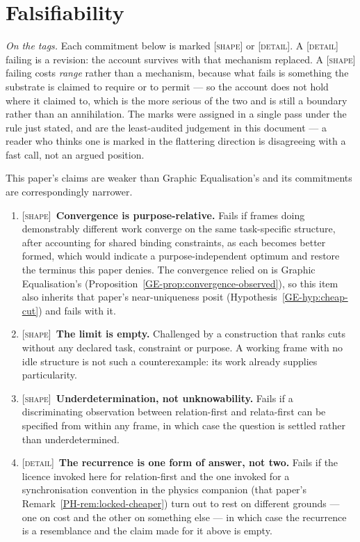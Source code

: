 \documentclass[11pt,a4paper]{article}
\theoremstyle{remark}\newtheorem{remark}[definition]{Remark}
\begin{document}
\section{Falsifiability}\label{sec:falsifiability}

\noindent\emph{On the tags.} Each commitment below is marked \textsc{[shape]} or \textsc{[detail]}.
A \textsc{[detail]} failing is a revision: the account survives with that mechanism replaced. A
\textsc{[shape]} failing costs \emph{range} rather than a mechanism, because what fails is something
the substrate is claimed to require or to permit --- so the account does not hold where it claimed to,
which is the more serious of the two and is still a boundary rather than an annihilation. The marks
were assigned in a single pass under the rule just stated, and are the least-audited judgement in this
document --- a reader who thinks one is marked in the flattering direction is disagreeing with a fast
call, not an argued position.

This paper's claims are weaker than Graphic Equalisation's and its commitments are correspondingly
narrower.

\begin{enumerate}[leftmargin=*]
\item \textsc{[shape]}~\textbf{Convergence is purpose-relative.} Fails if frames doing demonstrably different work
converge on the same task-specific structure, after accounting for shared binding constraints, as each becomes better formed, which would indicate a
purpose-independent optimum and restore the terminus this paper denies. The convergence relied on is
Graphic Equalisation's (Proposition~\ref{GE-prop:convergence-observed}), so this item also inherits
that paper's near-uniqueness posit (Hypothesis~\ref{GE-hyp:cheap-cut}) and fails with it.
\item \textsc{[shape]}~\textbf{The limit is empty.} Challenged by a construction that ranks cuts without any declared task, constraint or purpose. A working frame with no idle structure is not such a counterexample: its work already supplies particularity.
\item \textsc{[shape]}~\textbf{Underdetermination, not unknowability.} Fails if a discriminating observation between
relation-first and relata-first can be specified from within any frame, in which case the question is
settled rather than underdetermined.
\item \textsc{[detail]}~\textbf{The recurrence is one form of answer, not two.} Fails if the licence
invoked here for relation-first and the one invoked for a synchronisation convention in the physics
companion (that paper's Remark~\ref{PH-rem:locked-cheaper}) turn out to rest on different grounds ---
one on cost and the other on something else --- in which case the recurrence is a resemblance and the
claim made for it above is empty.
\end{enumerate}
\end{document}
